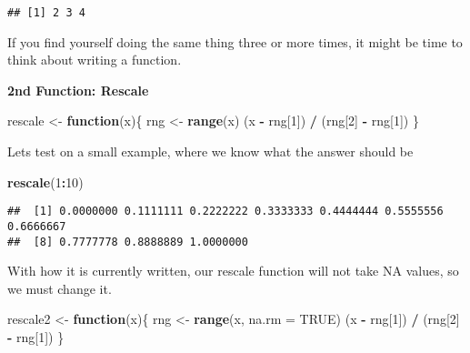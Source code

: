 \documentclass[]{article}
\newenvironment{Shaded}{\begin{snugshade}}{\end{snugshade}}
\newcommand{\KeywordTok}[1]{\textcolor[rgb]{0.13,0.29,0.53}{\textbf{#1}}}
\newcommand{\DataTypeTok}[1]{\textcolor[rgb]{0.13,0.29,0.53}{#1}}
\newcommand{\DecValTok}[1]{\textcolor[rgb]{0.00,0.00,0.81}{#1}}
\newcommand{\StringTok}[1]{\textcolor[rgb]{0.31,0.60,0.02}{#1}}
\newcommand{\OtherTok}[1]{\textcolor[rgb]{0.56,0.35,0.01}{#1}}
\newcommand{\ControlFlowTok}[1]{\textcolor[rgb]{0.13,0.29,0.53}{\textbf{#1}}}
\newcommand{\OperatorTok}[1]{\textcolor[rgb]{0.81,0.36,0.00}{\textbf{#1}}}
\newcommand{\NormalTok}[1]{#1}
\begin{document}
\begin{verbatim}
## [1] 2 3 4
\end{verbatim}

If you find yourself doing the same thing three or more times, it might
be time to think about writing a function.

\textbf{2nd Function: Rescale}

\begin{Shaded}
\begin{Highlighting}[]
\NormalTok{rescale <-}\StringTok{ }\ControlFlowTok{function}\NormalTok{(x)\{}
\NormalTok{  rng <-}\StringTok{ }\KeywordTok{range}\NormalTok{(x)}
\NormalTok{  (x }\OperatorTok{-}\StringTok{ }\NormalTok{rng[}\DecValTok{1}\NormalTok{]) }\OperatorTok{/}\StringTok{ }\NormalTok{(rng[}\DecValTok{2}\NormalTok{] }\OperatorTok{-}\StringTok{ }\NormalTok{rng[}\DecValTok{1}\NormalTok{])}
\NormalTok{\}}
\end{Highlighting}
\end{Shaded}

Lets test on a small example, where we know what the answer should be

\begin{Shaded}
\begin{Highlighting}[]
\KeywordTok{rescale}\NormalTok{(}\DecValTok{1}\OperatorTok{:}\DecValTok{10}\NormalTok{)}
\end{Highlighting}
\end{Shaded}

\begin{verbatim}
##  [1] 0.0000000 0.1111111 0.2222222 0.3333333 0.4444444 0.5555556 0.6666667
##  [8] 0.7777778 0.8888889 1.0000000
\end{verbatim}

With how it is currently written, our rescale function will not take NA
values, so we must change it.

\begin{Shaded}
\begin{Highlighting}[]
\NormalTok{rescale2 <-}\StringTok{ }\ControlFlowTok{function}\NormalTok{(x)\{}
\NormalTok{  rng <-}\StringTok{ }\KeywordTok{range}\NormalTok{(x, }\DataTypeTok{na.rm =} \OtherTok{TRUE}\NormalTok{)}
\NormalTok{  (x }\OperatorTok{-}\StringTok{ }\NormalTok{rng[}\DecValTok{1}\NormalTok{]) }\OperatorTok{/}\StringTok{ }\NormalTok{(rng[}\DecValTok{2}\NormalTok{] }\OperatorTok{-}\StringTok{ }\NormalTok{rng[}\DecValTok{1}\NormalTok{])}
\NormalTok{\}}
\end{Highlighting}
\end{Shaded}
\end{document}

